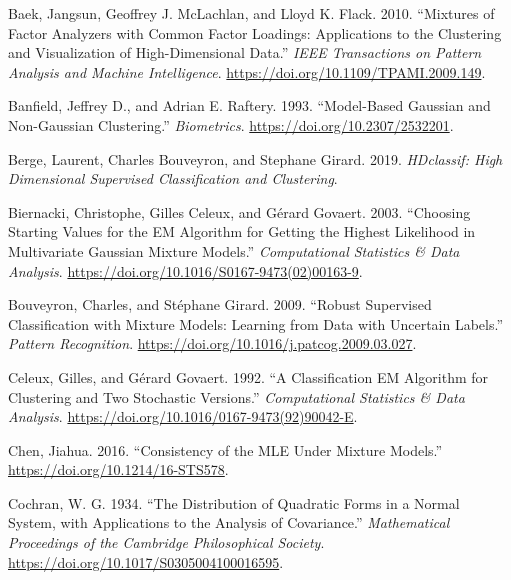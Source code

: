 \hypertarget{refs}{}
\begin{CSLReferences}{1}{0}
\leavevmode{}%
Baek, Jangsun, Geoffrey J. McLachlan, and Lloyd K. Flack. 2010. {``Mixtures of {Factor} {Analyzers} with {Common} {Factor} {Loadings}: {Applications} to the {Clustering} and {Visualization} of {High}-{Dimensional} {Data}.''} \emph{IEEE Transactions on Pattern Analysis and Machine Intelligence}. \url{https://doi.org/10.1109/TPAMI.2009.149}.

\leavevmode{}%
Banfield, Jeffrey D., and Adrian E. Raftery. 1993. {``Model-{Based Gaussian} and {Non-Gaussian Clustering}.''} \emph{Biometrics}. \url{https://doi.org/10.2307/2532201}.

\leavevmode{}%
Berge, Laurent, Charles Bouveyron, and Stephane Girard. 2019. \emph{HDclassif: High Dimensional Supervised Classification and Clustering}.

\leavevmode{}%
Biernacki, Christophe, Gilles Celeux, and Gérard Govaert. 2003. {``Choosing Starting Values for the {EM} Algorithm for Getting the Highest Likelihood in Multivariate {Gaussian} Mixture Models.''} \emph{Computational Statistics \& Data Analysis}. \url{https://doi.org/10.1016/S0167-9473(02)00163-9}.

\leavevmode{}%
Bouveyron, Charles, and Stéphane Girard. 2009. {``{Robust Supervised Classification} with {Mixture Models}: {Learning} from {Data} with {Uncertain Labels}.''} \emph{Pattern Recognition}. \url{https://doi.org/10.1016/j.patcog.2009.03.027}.

\leavevmode{}%
Celeux, Gilles, and Gérard Govaert. 1992. {``A Classification {EM} Algorithm for Clustering and Two Stochastic Versions.''} \emph{Computational Statistics \& Data Analysis}. \url{https://doi.org/10.1016/0167-9473(92)90042-E}.

\leavevmode{}%
Chen, Jiahua. 2016. {``Consistency of the {MLE} Under Mixture Models.''} \url{https://doi.org/10.1214/16-STS578}.

\leavevmode{}%
Cochran, W. G. 1934. {``The Distribution of Quadratic Forms in a Normal System, with Applications to the Analysis of Covariance.''} \emph{Mathematical Proceedings of the Cambridge Philosophical Society}. \url{https://doi.org/10.1017/S0305004100016595}.


\end{CSLReferences}
